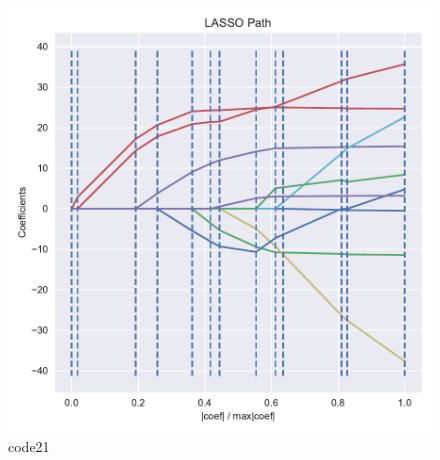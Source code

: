 \begin{PythonCode}\label{例14}
	
\end{PythonCode}

\begin{figure}[htbp]
	\centering
	\includegraphics[width=14cm]{codeimage/code21}
	\caption{code21}
	\label{code21}
\end{figure}

\begin{PythonCode}\label{例15}
	
\end{PythonCode}

